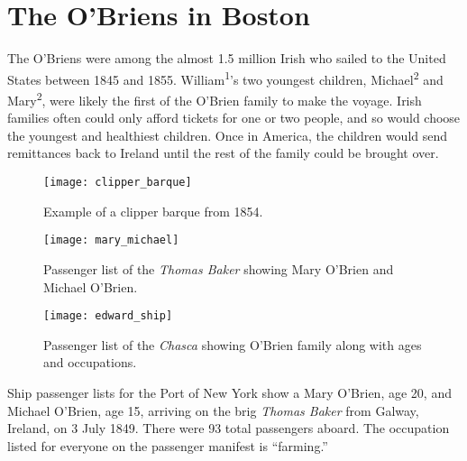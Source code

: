 \chapter{The O'Briens in Boston}

The O'Briens were among the almost 1.5 million Irish who sailed to the United States between 1845 and 1855.\cite{Miller:291} William\textsuperscript{1}'s two youngest children, Michael\textsuperscript{2} and Mary\textsuperscript{2}, were likely the first of the O'Brien family to make the voyage. Irish families often could only afford tickets for one or two people, and so would choose the youngest and healthiest children.\cite{Miller:292} Once in America, the children would send remittances back to Ireland until the rest of the family could be brought over.\cite{Miller:295}

\begin{figure}[htbp]
	\centering
	\texttt{[image: clipper\_barque]}
	\caption{Example of a clipper barque from 1854.}
	\label{fig:Clipper}
\end{figure}

\begin{figure}[htbp]
	\centering
	\texttt{[image: mary\_michael]}
	\caption{Passenger list of the \textit{Thomas Baker} showing Mary O'Brien and Michael O'Brien.}
	\label{fig:ThomasBaker}
\end{figure}

\begin{figure}[htbp]
	\centering
	\texttt{[image: edward\_ship]}
	\caption{Passenger list of the \textit{Chasca} showing O'Brien family along with ages and occupations.}
	\label{fig:Chasca}
\end{figure}

Ship passenger lists for the Port of New York show a Mary O'Brien, age 20, and Michael O'Brien, age 15, arriving on the brig \textit{Thomas Baker} from Galway, Ireland, on 3 July 1849. There were 93 total passengers aboard. The occupation listed for everyone on the passenger manifest is ``farming.''\cite{ThomasBaker}

